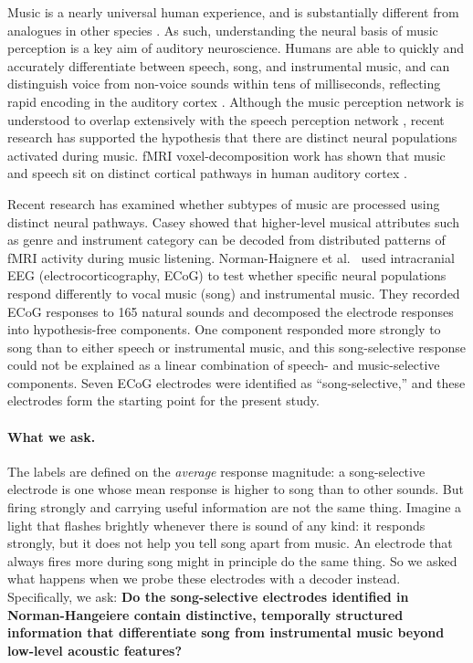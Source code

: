 \documentclass[11pt]{article}
\begin{document}
Music is a nearly universal human experience, and is substantially different from analogues in other species \cite{Patel2019}. As such, understanding the neural basis of music perception is a key aim of auditory neuroscience. Humans are able to quickly and accurately differentiate between speech, song, and instrumental music, and can distinguish voice from non-voice sounds within tens of milliseconds, reflecting rapid encoding in the auditory cortex \cite{Mesgarani2014}. Although the music perception network is understood to overlap extensively with the speech perception network \cite{Yi2019,Rogalsky2011,Abrams2011}, recent research has supported the hypothesis that there are distinct neural populations activated during music. fMRI voxel-decomposition work has shown that music and speech sit on distinct cortical pathways in human auditory cortex \cite{NormanHaignere2015}.

Recent research has examined whether subtypes of music are processed using distinct neural pathways. Casey \cite{Casey2017} showed that higher-level musical attributes such as genre and instrument category can be decoded from distributed patterns of fMRI activity during music listening. Norman-Haignere et al.\ \cite{NormanHaignere2022} used intracranial EEG (electrocorticography, ECoG) to test whether specific neural populations respond differently to vocal music (song) and instrumental music. They recorded ECoG responses to 165 natural sounds and decomposed the electrode responses into hypothesis-free components. One component responded more strongly to song than to either speech or instrumental music, and this song-selective response could not be explained as a linear combination of speech- and music-selective components. Seven ECoG electrodes were identified as ``song-selective,'' and these electrodes form the starting point for the present study.

\paragraph{What we ask.} The \citet{NormanHaignere2022} labels are defined on the \emph{average} response magnitude: a song-selective electrode is one whose mean response is higher to song than to other sounds. But firing strongly and carrying useful information are not the same thing. Imagine a light that flashes brightly whenever there is sound of any kind: it responds strongly, but it does not help you tell song apart from music. An electrode that always fires more during song might in principle do the same thing. So we asked what happens when we probe these electrodes with a decoder instead. Specifically, we ask: \textbf{Do the song-selective electrodes identified in Norman-Hangeiere contain distinctive, temporally structured information that differentiate song from instrumental music beyond low-level acoustic features?}
\end{document}
